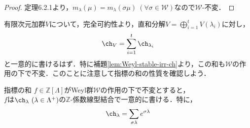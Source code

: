 \documentclass[rep_main]{subfiles}
\begin{document}
\begin{proof}
	定理6.2.1より，$m_\lambda(\mu) = m_\lambda(\sigma\mu)\ (\forall \sigma \in \mathscr{W})$なので$\mathscr{W}$-不変．
\end{proof}
有限次元加群$V$について，完全可約性より，直和分解$V = \bigoplus_{i=1}^t V(\lambda_i)$に対し，
\begin{equation}
	\ch_V = \sum_{i=1}^t \ch_{\lambda_i}
\end{equation}
と一意的に書けるはず．特に補題\ref{lem:Weyl-stable-irr-ch}より，この和も$\mathscr{W}$の作用の下で不変．このことに注意して指標の和の性質を確認しよう．
\begin{myprop}[label=prop:alg-character-add]{指標の和}
	$f \in \mathbb{Z}[\Lambda]$がWeyl群$\mathscr{W}$の作用の下で不変とすると，\\
	$f$は$\ch_\lambda\ (\lambda \in \Lambda^+)$の$\mathbb{Z}$-係数線型結合で一意的に書ける．特に，
	\begin{equation}
		\ch_\lambda = \sum_{\sigma\lambda} e^{\sigma\lambda}
	\end{equation}
\end{myprop}
\end{document}
